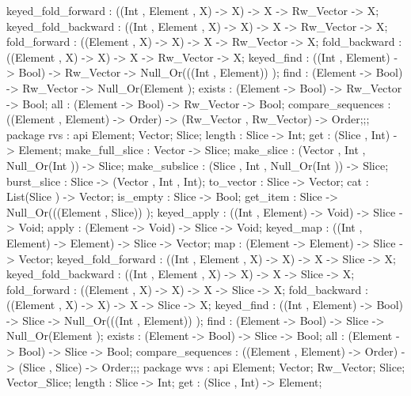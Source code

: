 {{                keyed_fold_forward : ((Int , Element , X) -> X) -> X -> Rw_Vector -> X;
                keyed_fold_backward : ((Int , Element , X) -> X) -> X -> Rw_Vector -> X;
                fold_forward : ((Element , X) -> X) -> X -> Rw_Vector -> X;
                fold_backward : ((Element , X) -> X) -> X -> Rw_Vector -> X;
                keyed_find : ((Int , Element) -> Bool) -> Rw_Vector -> Null_Or(((Int , Element)) );
                find : (Element -> Bool) -> Rw_Vector -> Null_Or(Element );
                exists : (Element -> Bool) -> Rw_Vector -> Bool;
                all : (Element -> Bool) -> Rw_Vector -> Bool;
                compare_sequences : ((Element , Element) -> Order) -> (Rw_Vector , Rw_Vector) -> Order;};;
        package rvs
          : api {
                Element;
                Vector;
                Slice;
                length : Slice -> Int;
                get : (Slice , Int) -> Element;
                make_full_slice : Vector -> Slice;
                make_slice : (Vector , Int , Null_Or(Int )) -> Slice;
                make_subslice : (Slice , Int , Null_Or(Int )) -> Slice;
                burst_slice : Slice -> (Vector , Int , Int);
                to_vector : Slice -> Vector;
                cat : List(Slice ) -> Vector;
                is_empty : Slice -> Bool;
                get_item : Slice -> Null_Or(((Element , Slice)) );
                keyed_apply : ((Int , Element) -> Void) -> Slice -> Void;
                apply : (Element -> Void) -> Slice -> Void;
                keyed_map : ((Int , Element) -> Element) -> Slice -> Vector;
                map : (Element -> Element) -> Slice -> Vector;
                keyed_fold_forward : ((Int , Element , X) -> X) -> X -> Slice -> X;
                keyed_fold_backward : ((Int , Element , X) -> X) -> X -> Slice -> X;
                fold_forward : ((Element , X) -> X) -> X -> Slice -> X;
                fold_backward : ((Element , X) -> X) -> X -> Slice -> X;
                keyed_find : ((Int , Element) -> Bool) -> Slice -> Null_Or(((Int , Element)) );
                find : (Element -> Bool) -> Slice -> Null_Or(Element );
                exists : (Element -> Bool) -> Slice -> Bool;
                all : (Element -> Bool) -> Slice -> Bool;
                compare_sequences : ((Element , Element) -> Order) -> (Slice , Slice) -> Order;};;
        package wvs
          : api {
                Element;
                Vector;
                Rw_Vector;
                Slice;
                Vector_Slice;
                length : Slice -> Int;
                get : (Slice , Int) -> Element;
}}
